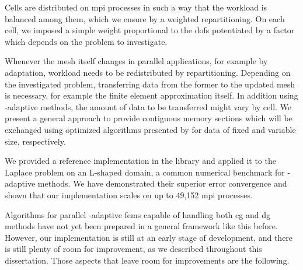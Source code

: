 Cells are distributed on \gls{mpi} processes in such a way that the workload is balanced among them, which we ensure by a weighted repartitioning. On each cell, we imposed a simple weight proportional to the \glspl{dof} potentiated by a factor which depends on the problem to investigate.

Whenever the mesh itself changes in parallel applications, for example by adaptation, workload needs to be redistributed by repartitioning. Depending on the investigated problem, transferring data from the former to the updated mesh is necessary, for example the finite element approximation itself. In addition using \hp-adaptive methods, the amount of data to be transferred might vary by cell. We present a general approach to provide contiguous memory sections which will be exchanged using optimized algorithms presented by \textcite{burstedde2018} for data of fixed and variable size, respectively.



We provided a reference implementation in the \dealii{} library and applied it to the Laplace problem on an L-shaped domain, a common numerical benchmark for \hp-adaptive methods. We have demonstrated their superior error convergence and shown that our implementation scales on up to 49,152 \gls{mpi} processes.




Algorithms for parallel \hp-adaptive \glspl{fem} capable of handling both \gls{cg} and \gls{dg} methods have not yet been prepared in a general framework like this before. However, our implementation is still at an early stage of development, and there is still plenty of room for improvement, as we described throughout this dissertation. Those aspects that leave room for improvements are the following.

